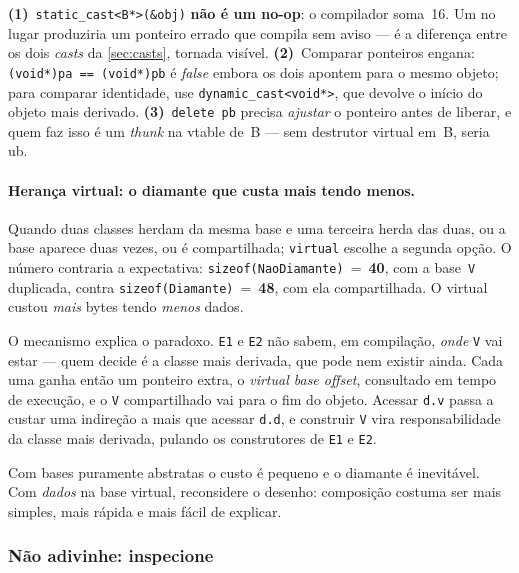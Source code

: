 \begin{armadilha}
\textbf{(1)}~\texttt{static\_cast<B*>(\&obj)} \textbf{não é um no-op}: o
compilador soma~16. Um  no lugar produziria um
ponteiro errado que compila sem aviso --- é a diferença entre os dois
\emph{casts} da \cref{sec:casts}, tornada visível.
\textbf{(2)}~Comparar ponteiros engana: \texttt{(void*)pa == (void*)pb} é
\emph{false} embora os dois apontem para o mesmo objeto; para comparar
identidade, use \texttt{dynamic\_cast<void*>}, que devolve o início do objeto
mais derivado. \textbf{(3)}~\texttt{delete pb} precisa \emph{ajustar} o ponteiro
antes de liberar, e quem faz isso é um \emph{thunk} na vtable de~B --- sem
destrutor virtual em~B, seria \gls{ub}.
\end{armadilha}

\paragraph{Herança virtual: o diamante que custa mais tendo menos.} Quando duas
classes herdam da mesma base e uma terceira herda das duas, ou a base aparece
duas vezes, ou é compartilhada; \texttt{virtual} escolhe a segunda opção. O
número contraria a expectativa: \texttt{sizeof(NaoDiamante)}~=~\textbf{40}, com
a base~\texttt{V} duplicada, contra \texttt{sizeof(Diamante)}~=~\textbf{48}, com
ela compartilhada. O virtual custou \emph{mais} bytes tendo \emph{menos} dados.

O mecanismo explica o paradoxo. \texttt{E1} e \texttt{E2} não sabem, em
compilação, \emph{onde} \texttt{V} vai estar --- quem decide é a classe mais
derivada, que pode nem existir ainda. Cada uma ganha então um ponteiro extra, o
\emph{virtual base offset}, consultado em tempo de execução, e o \texttt{V}
compartilhado vai para o fim do objeto. Acessar \texttt{d.v} passa a custar uma
indireção a mais que acessar \texttt{d.d}, e construir \texttt{V} vira
responsabilidade da classe mais derivada, pulando os construtores de \texttt{E1}
e \texttt{E2}.

\begin{regra}
Com bases puramente abstratas o custo é pequeno e o diamante é inevitável. Com
\emph{dados} na base virtual, reconsidere o desenho: composição costuma ser mais
simples, mais rápida e mais fácil de explicar.
\end{regra}

\subsubsection{Não adivinhe: inspecione}

